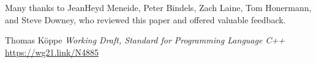 \documentclass{wg21}
\begin{document}
    Many thanks to JeanHeyd Meneide, Peter Bindels, Zach Laine, Tom Honermann, and Steve Downey, who reviewed this paper and offered valuable feedback.
    
    
    
    
    
    
    \renewcommand{\section}[2]{}%
    \begin{thebibliography}{9}
        Thomas Köppe
        \emph{Working Draft, Standard for Programming Language C++}\newline
        \url{https://wg21.link/N4885}
    \end{thebibliography}
    
\end{document}
